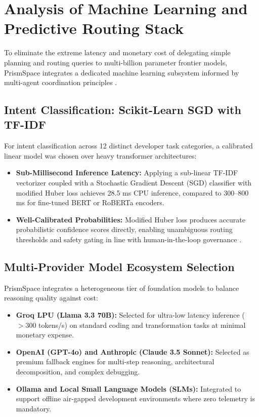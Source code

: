 \documentclass[12pt,a4paper]{report}
\begin{document}
\section{Analysis of Machine Learning and Predictive Routing Stack}
To eliminate the extreme latency and monetary cost of delegating simple planning and routing queries to multi-billion parameter frontier models, PrismSpace integrates a dedicated machine learning subsystem informed by multi-agent coordination principles \cite{ref_wong2023_marlsurvey, ref_aina2026_smadrl}.

\subsection{Intent Classification: Scikit-Learn SGD with TF-IDF}
For intent classification across 12 distinct developer task categories, a calibrated linear model was chosen over heavy transformer architectures:
\begin{itemize}
    \item \textbf{Sub-Millisecond Inference Latency:} Applying a sub-linear TF-IDF vectorizer coupled with a Stochastic Gradient Descent (SGD) classifier with modified Huber loss achieves 28.5 ms CPU inference, compared to 300--800 ms for fine-tuned BERT or RoBERTa encoders.
    \item \textbf{Well-Calibrated Probabilities:} Modified Huber loss produces accurate probabilistic confidence scores directly, enabling unambiguous routing thresholds and safety gating in line with human-in-the-loop governance \cite{ref_siebert2023_humancontrol, ref_vyhmeister2023_responsibleai}.
\end{itemize}

\subsection{Multi-Provider Model Ecosystem Selection}
PrismSpace integrates a heterogeneous tier of foundation models to balance reasoning quality against cost:
\begin{itemize}
    \item \textbf{Groq LPU (Llama 3.3 70B):} Selected for ultra-low latency inference ($>300$ tokens/s) on standard coding and transformation tasks at minimal monetary expense.
    \item \textbf{OpenAI (GPT-4o) and Anthropic (Claude 3.5 Sonnet):} Selected as premium fallback engines for multi-step reasoning, architectural decomposition, and complex debugging.
    \item \textbf{Ollama and Local Small Language Models (SLMs):} Integrated to support offline air-gapped development environments where zero telemetry is mandatory.
\end{itemize}
\end{document}
